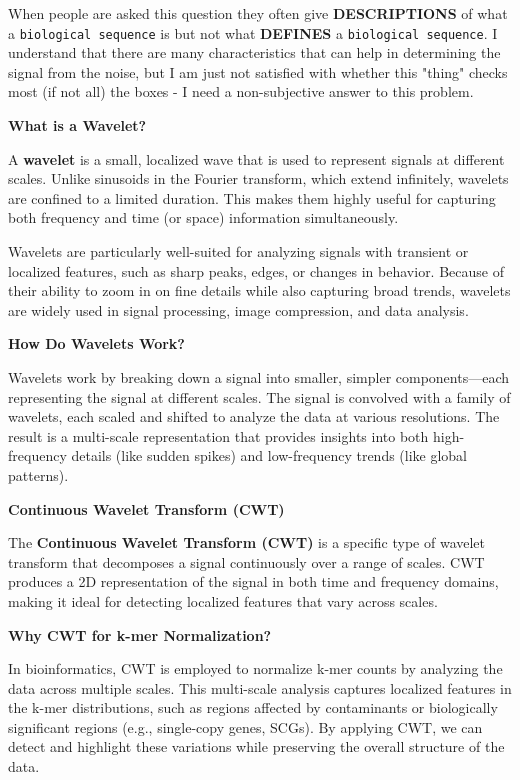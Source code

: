\documentclass[11pt]{report}
\begin{document}
{\begin{tcolorbox}[colback=gray!10!white, coltitle=white, colframe=gray!80!black, title=Biological Information]
	When people are asked this question they often give \textbf{DESCRIPTIONS} of what a \texttt{biological sequence} is but not what \textbf{DEFINES} a \texttt{biological sequence}. I understand that there are many characteristics that can help in determining the signal from the noise, but I am just not satisfied with whether this "thing" checks most (if not all) the boxes - I need a non-subjective answer to this problem. 
\end{tcolorbox}


\begin{tcolorbox}[label=box:Wavelets, colback=gray!10!white, coltitle=white, colframe=gray!80!black, title=Box on Wavelets, breakable]
	\textbf{What is a Wavelet?} 
	
	A \textbf{wavelet} is a small, localized wave that is used to represent signals at different scales. Unlike sinusoids in the Fourier transform, which extend infinitely, wavelets are confined to a limited duration. This makes them highly useful for capturing both frequency and time (or space) information simultaneously.
	
	Wavelets are particularly well-suited for analyzing signals with transient or localized features, such as sharp peaks, edges, or changes in behavior. Because of their ability to zoom in on fine details while also capturing broad trends, wavelets are widely used in signal processing, image compression, and data analysis.
	
	\textbf{How Do Wavelets Work?}
	
	Wavelets work by breaking down a signal into smaller, simpler components—each representing the signal at different scales. The signal is convolved with a family of wavelets, each scaled and shifted to analyze the data at various resolutions. The result is a multi-scale representation that provides insights into both high-frequency details (like sudden spikes) and low-frequency trends (like global patterns).
	
	\textbf{Continuous Wavelet Transform (CWT)}
	
	The \textbf{Continuous Wavelet Transform (CWT)} is a specific type of wavelet transform that decomposes a signal continuously over a range of scales. CWT produces a 2D representation of the signal in both time and frequency domains, making it ideal for detecting localized features that vary across scales.
	
	\textbf{Why CWT for k-mer Normalization?}
	
	In bioinformatics, CWT is employed to normalize k-mer counts by analyzing the data across multiple scales. This multi-scale analysis captures localized features in the k-mer distributions, such as regions affected by contaminants or biologically significant regions (e.g., single-copy genes, SCGs). By applying CWT, we can detect and highlight these variations while preserving the overall structure of the data.
	

\end{tcolorbox}}
\end{document}
